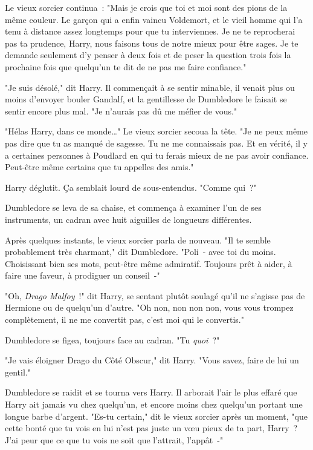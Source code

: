 Le vieux sorcier continua~: "Mais je crois que toi et moi sont des pions de la même couleur. Le garçon qui a enfin vaincu Voldemort, et le vieil homme qui l'a tenu à distance assez longtemps pour que tu interviennes. Je ne te reprocherai pas ta prudence, Harry, nous faisons tous de notre mieux pour être sages. Je te demande seulement d'y penser à deux fois et de peser la question trois fois la prochaine fois que quelqu'un te dit de ne pas me faire confiance."

"Je suis désolé," dit Harry. Il commençait à se sentir minable, il venait plus ou moins d'envoyer bouler Gandalf, et la gentillesse de Dumbledore le faisait se sentir encore plus mal. "Je n'aurais pas dû me méfier de vous."

"Hélas Harry, dans ce monde…" Le vieux sorcier secoua la tête. "Je ne peux même pas dire que tu as manqué de sagesse. Tu ne me connaissais pas. Et en vérité, il y a certaines personnes à Poudlard en qui tu ferais mieux de ne pas avoir confiance. Peut-être même certains que tu appelles des amis."

Harry déglutit. Ça semblait lourd de sous-entendus. "Comme qui~?"

Dumbledore se leva de sa chaise, et commença à examiner l'un de ses instruments, un cadran avec huit aiguilles de longueurs différentes.

Après quelques instants, le vieux sorcier parla de nouveau. "Il te semble probablement très charmant," dit Dumbledore. "Poli~- avec toi du moins. Choisissant bien ses mots, peut-être même admiratif. Toujours prêt à aider, à faire une faveur, à prodiguer un conseil~-"

"Oh, \emph{Drago Malfoy}~!" dit Harry, se sentant plutôt soulagé qu'il ne s'agisse pas de Hermione ou de quelqu'un d'autre. "Oh non, non non non, vous vous trompez complètement, il ne me convertit pas, c'est moi qui le convertis."

Dumbledore se figea, toujours face au cadran. "Tu \emph{quoi}~?"

"Je vais éloigner Drago du Côté Obscur," dit Harry. "Vous savez, faire de lui un gentil."

Dumbledore se raidit et se tourna vers Harry. Il arborait l'air le plus effaré que Harry ait jamais vu chez quelqu'un, et encore moins chez quelqu'un portant une longue barbe d'argent. "Es-tu certain," dit le vieux sorcier après un moment, "que cette bonté que tu vois en lui n'est pas juste un vœu pieux de ta part, Harry~? J'ai peur que ce que tu vois ne soit que l'attrait, l'appât~-"

